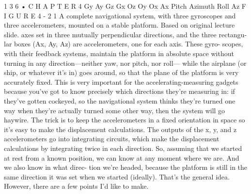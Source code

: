 \documentclass[10pt,oneside]{article}
\begin{document}
1 3 6 • C H A P T E R  4 Gy Ay Gz Gx Oz Oy Ox Ax Pitch Azimuth Roll Az F I G U R E  4 - 2 1 A complete navigational system, with three gyroscopes and three accelerometers, mounted on a stable platform. Based on original lecture slide. axes set in three mutually perpendicular directions, and the three rectangu- lar boxes (Ax, Ay, Az) are accelerometers, one for each axis. These gyro- scopes, with their feedback systems, maintain the platform in absolute space without turning in any direction---neither yaw, nor pitch, nor roll--- while the airplane (or ship, or whatever it’s in) goes around, so that the plane of the platform is very accurately fixed. This is very important for the accelerating-measuring gadgets because you’ve got to know precisely which directions they’re measuring in: if they’ve gotten cockeyed, so the navigational system thinks they’re turned one way when they’re actually turned some other way, then the system will go haywire. The trick is to keep the accelerometers in a fixed orientation in space so it’s easy to make the displacement calculations. The outputs of the x, y, and z accelerometers go into integrating circuits, which make the displacement calculations by integrating twice in each direction. So, assuming that we started at rest from a known position, we can know at any moment where we are. And we also know in what direc- tion we’re headed, because the platform is still in the same direction it was set when we started (ideally). That’s the general idea. However, there are a few points I’d like to make.\par
\end{document}
